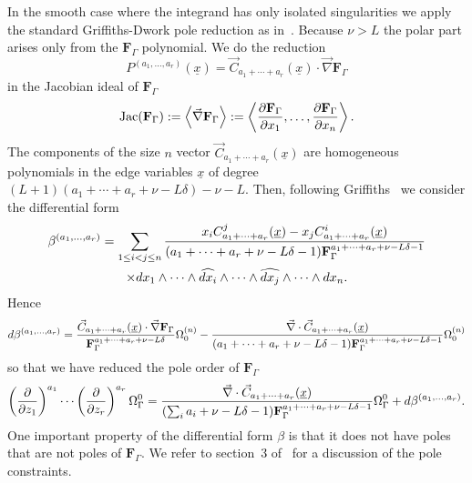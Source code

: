 \documentclass[a4paper,12pt]{article}
\newcommand\lNote[1]{
	\todo[backgroundcolor=red!20!white,fancyline,
	bordercolor=white]{ LDLC:  #1}}
\numberwithin{equation}{section}
\numberwithin{figure}{section}
\begin{document}
In the smooth case where the integrand has only isolated singularities
  we apply the standard Griffiths-Dwork
 pole reduction as in~\cite{Bloch:2016izu}.
  Because  $\nu>L$ the polar part arises
 only from the $\textbf{F}_\Gamma$ polynomial. 
 We  do the reduction 
\begin{equation}\label{e:GD}
 P^{(a_1,\dots,a_r)}(\underline x) = \vec C_{a_1+\cdots+a_r}(\underline x)\cdot
   \vec\nabla   \textbf{F}_\Gamma
 \end{equation}
 in the Jacobian ideal of $ \textbf{F}_\Gamma$
 \begin{equation}
   \textrm{Jac}(   \textbf{F}_\Gamma) :=\left\langle\vec\nabla  \textbf{F}_\Gamma \right\rangle :=\left\langle{\partial
       \textbf{F}_\Gamma\over\partial x_1},\dots,  {\partial
       \textbf{F}_\Gamma\over\partial x_n}\right\rangle.
 \end{equation}
The components of the size $n$ vector $ \vec C_{a_1+\cdots+a_r}(\underline x)$ are homogeneous polynomials in the
     edge variables $\underline x$ of degree
     $(L+1)(a_1+\cdots+a_r+\nu-L\delta)-\nu-L$. 
%
   Then,  following Griffiths~\cite{Griffith1,Griffith2} we consider the differential form
   \begin{multline}\label{e:betadef}
  \beta^{(a_1,\dots,a_r)}=  \sum_{1\leq i<j\leq n} {x_i
    C_{a_1+\cdots+a_r}^j  (\underline x)-x_j
    C_{a_1+\cdots+a_r}^i(\underline x)\over  (a_1+\cdots+a_r+\nu-L\delta-1)\textbf{F}_\Gamma^{a_1+\cdots+a_r+\nu-L\delta-1}}\cr\times
 dx_1\wedge \cdots \wedge \widehat{dx_i}\wedge \cdots \wedge\widehat{dx_j}\wedge
  \cdots \wedge dx_n .
   \end{multline}
%
 Hence 
   \begin{equation}
     d\beta^{(a_1,\dots,a_r)}= {  \vec   C_{a_1+\cdots+a_r}
     (\underline x)
\cdot    \vec \nabla\textbf{F}_\Gamma\over
     \textbf{F}_\Gamma^{a_1+\cdots+a_r+\nu-L\delta}}\Omega_0^{(n)}-{
\vec\nabla \cdot \vec C_{a_1+\cdots+a_r}
     (\underline x)
    \over    (a_1+\cdots+a_r+\nu-L\delta-1)\textbf{F}_\Gamma^{a_1+\cdots+a_r+\nu-L\delta-1}} \Omega_0^{(n)} 
   \end{equation}
   so that we have reduced the pole order  of $ \textbf{F}_\Gamma$ \lNote{$\mathrm{a} := \sum_i a_i$ ?}
   \begin{equation}\label{e:GDstart}
\left(\partial\over \partial z_1\right)^{a_1}\cdots\left(\partial
  \over\partial z_r\right)^{a_r} \Omega^0_\Gamma= {\vec\nabla \cdot
  \vec C_{a_1+\cdots+a_r} (\underline x)
  \over   (\sum_i a_i+\nu-L\delta-1)\textbf{F}_\Gamma^{a_1+\cdots +a_r+\nu-L\delta-1}}   \Omega_\Gamma^0+d\beta^{(a_1,\dots,a_r)}.
\end{equation}
One important property of the differential form $\beta$ is that it
does not have poles that are not poles of $\textbf{F}_\Gamma$. We refer
to section~3 of~\cite{Lairez:2022zkj} for a discussion of the pole constraints.
\end{document}
